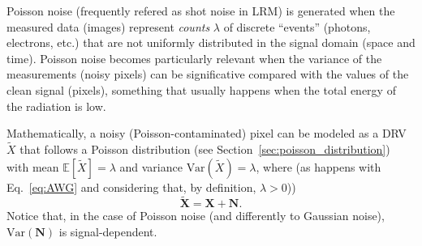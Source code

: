 
Poisson noise (frequently refered as shot noise in \gls{LRM}) is
generated when the measured data (images) represent \emph{counts}
$\lambda$ of discrete ``events'' (photons, electrons, etc.) that are
not uniformly distributed in the signal domain (space and
time). Poisson noise becomes particularly relevant when the variance
of the measurements (noisy pixels) can be significative compared with
the values of the clean signal (pixels), something that usually
happens when the total energy of the radiation is low.

Mathematically, a noisy (Poisson-contaminated) pixel can be modeled as
a \gls{DRV} $\tilde{X}$ that follows a Poisson distribution (see
Section~\ref{sec:poisson_distribution}) with mean
$\mathbb{E}[\tilde{X}]=\lambda$ and variance
$\text{Var}(\tilde{X})=\lambda$, where (as happens with Eq.~\ref{eq:AWG}
and considering that, by definition, $\lambda>0$))
\begin{equation}
  \tilde{\bm{X}} = \bm{X} + \bm{N}.
  \label{eq:additive_Poisson}
\end{equation}
Notice that, in the case of Poisson noise (and differently to Gaussian
noise), $\text{Var}(\bm{N})$ is signal-dependent.

